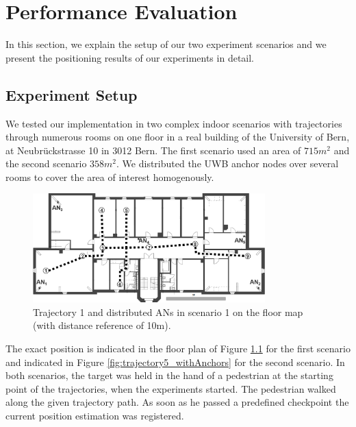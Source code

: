 
\chapter{Performance Evaluation} %

\label{Chapter5} %
In this section, we explain the setup of our two experiment scenarios and we present the positioning results of our experiments in detail.


\section{Experiment Setup}
We tested our implementation in two complex indoor scenarios with trajectories through numerous rooms on one floor in a real building of the University of Bern, at Neubrückstrasse 10 in
3012 Bern. The first scenario used an area of $715m^2$ and the second scenario $358m^2$. We distributed the UWB anchor nodes over several rooms to cover the area of interest homogenously.
\begin{figure}[th]
\centering
\includegraphics[width=0.8\textwidth]{Figures/trajectory1_withAnchors}
\decoRule
\caption[Anchor Node Positions of Scenario 1]{Trajectory 1 and distributed ANs in scenario 1 on the floor map (with distance reference of 10m).}
\label{fig:trajectory1_withAnchors}
\end{figure}The exact position is indicated in the floor plan of Figure \ref{fig:trajectory1_withAnchors} for the first scenario and indicated in Figure \ref{fig:trajectory5_withAnchors} for the second scenario. In both scenarios, the target was held in the hand of a pedestrian at the starting point of the trajectories, when the experiments started. The pedestrian walked along the given trajectory path. As soon as he passed a predefined checkpoint the current position estimation was registered.\\
